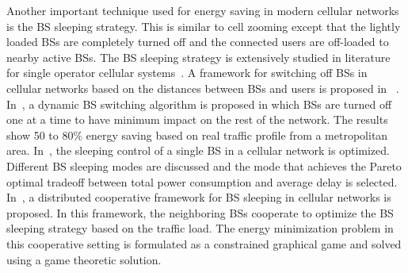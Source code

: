 \documentclass[10pt, letter, twocolumn]{IEEEtran}
\begin{document}
Another important technique used for energy saving in modern cellular networks is the BS sleeping strategy. This is similar to cell zooming except that the lightly loaded BSs are completely turned off and the connected users are off-loaded to nearby active BSs. The BS sleeping strategy is extensively studied in literature for single operator cellular systems~\cite{greedy_Bousia,6489498,BS_sleeping_12,BS_sleeping_11}. A framework for switching off BSs in cellular networks based on the distances between BSs and users is proposed in ~\cite{greedy_Bousia}. In~\cite{6489498}, a dynamic BS switching algorithm is proposed in which BSs are turned off one at a time to have minimum impact on the rest of the network. The results show 50 to 80$\%$ energy saving based on real traffic profile from a metropolitan area. In~\cite{BS_sleeping_12}, the sleeping control of a single BS in a cellular network is optimized. Different BS sleeping modes are discussed and the mode that achieves the Pareto optimal tradeoff between total power consumption and average delay is selected. In~\cite{BS_sleeping_11}, a distributed cooperative framework for BS sleeping in cellular networks is proposed. In this framework, the neighboring BSs cooperate to optimize the BS sleeping strategy based on the traffic load. The energy minimization problem in this cooperative setting is formulated as a constrained graphical game and solved using a game theoretic solution.
\end{document}
